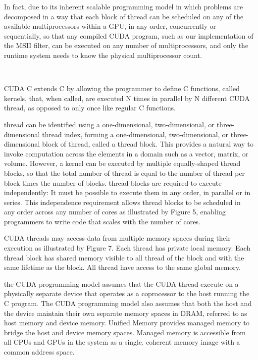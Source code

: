 \documentclass[openany]{book}
\begin{document}
In fact, due to its inherent scalable programming model in which problems are 
decomposed in a way that each block of thread can be scheduled on 
any of the available multiprocessors within a GPU, in any order, concurrently 
or sequentially, so that any compiled CUDA program, such as our implementation 
of the MSII filter, can be executed on any number of multiprocessors, and only 
the runtime system needs to know the physical multiprocessor 
count.~\cite[p.~1.3]{CUDA18}

~~~~~~~~~

CUDA C extends C by allowing the programmer to define C functions, called 
kernels, that, when called, are executed N times in parallel by N different 
CUDA thread, as opposed to only once like regular C 
functions.~\cite[p.~2.1]{CUDA18}

thread can be identified using a one-dimensional, 
two-dimensional, or three-dimensional thread index, forming a 
one-dimensional, two-dimensional, or three-dimensional block of 
thread, called a thread block. This provides a 
natural way to invoke computation across the elements in a domain such as a 
vector, matrix, or volume. However, a kernel can be executed by multiple 
equally-shaped thread blocks, so that the total number of 
thread is equal to the number of thread per block 
times the number of blocks. thread blocks are required to execute 
independently: It must be possible to execute them in any order, in parallel or 
in series. This independence requirement allows thread blocks to 
be scheduled in any order across any number of cores as illustrated by Figure 5, 
enabling programmers to write code that scales with the number of 
cores.~\cite[p.~2.2]{CUDA18}

CUDA threads may access data from multiple memory spaces during 
their execution as illustrated by Figure 7. Each thread has 
private local memory. Each thread block has shared memory visible 
to all thread of the block and with the same lifetime as the 
block. All thread have access to the same global 
memory.~\cite[p.~2.3]{CUDA18}

the CUDA programming model assumes that the CUDA thread execute 
on a physically separate device that operates as a coprocessor to the host 
running the C program. The CUDA programming model also assumes that both the 
host and the device maintain their own separate memory spaces in DRAM, 
referred to as host memory and device memory. Unified Memory provides managed 
memory to bridge the host and device memory spaces. Managed memory is 
accessible from all CPUs and GPUs in the system as a single, coherent memory 
image with a common address space.~\cite[p.~2.4]{CUDA18}
\end{document}
